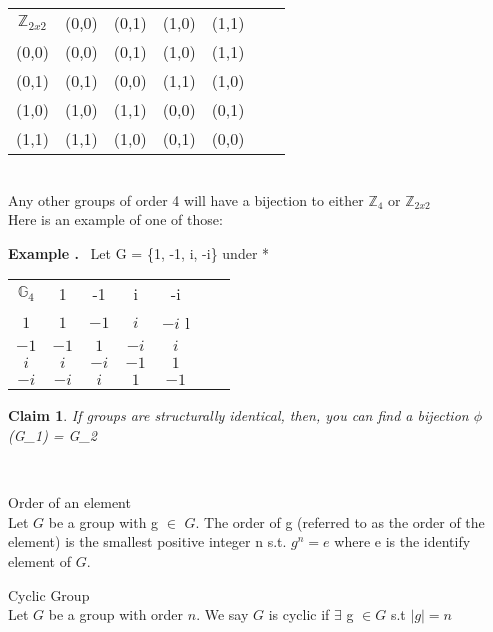 \documentclass{article}
\newcounter{example}
\newcounter{claim}
\newcounter{solution}
\theoremstyle{claim}
\newtheorem{claim}{Claim}[section]
\newcommand\Example{%
  \stepcounter{example}%
  \textbf{Example \theexample.}~%
  \setcounter{solution}{0}%
}
\begin{document}
\begin{center}
\setlength\extrarowheight{3pt}
\begin{tabular}{c | c c c c c c}
    $\mathbb{Z}_{2x2}$ &(0,0) & (0,1) & (1,0) & (1,1)  \\
    \cline{1-5}
    (0,0) & (0,0) & (0,1) & (1,0) & (1,1)  	\\
    (0,1) & (0,1) & (0,0) & (1,1) & (1,0) 	\\
    (1,0) & (1,0) & (1,1) & (0,0) & (0,1)		\\
    (1,1) & (1,1) & (1,0) & (0,1) & (0,0)		\\
\end{tabular}
\end{center}\\
Any other groups of order 4 will have a bijection to either $\mathbb{Z}_{4}$ or $\mathbb{Z}_{2x2}$\\
Here is an example of one of those:

\Example Let G = \{1, -1, i, -i\} under *\\
 
\begin{center}
\setlength\extrarowheight{3pt}
\begin{tabular}{c | c c c c c c}
    $\mathbb{G}_{4}$ & 1 & -1 & i & -i  \\
    \cline{1-5}
    $1$&$1$&$-1$&$ i$&$-i$  	l\\
    $-1$&$-1$&$1$&$-i$&$i$	\\
    $i$&$i$&$-i$&$-1$& $1$	\\
    $-i$&$-i$&$i$&$1$&$-1$	\\
\end{tabular}
\end{center}

\begin{claim}{}
If groups are structurally identical, then, you can find a bijection $\phi$(G_{1}) =  G_{2}
\end{claim}\\

\begin{definition}{Order of an element}\\
Let $G$ be a group with g $\in$ $G$. The order of g (referred to as the order of the element) is the smallest positive integer n s.t. $g^{n} = e$ where e is the identify element of $G$. 
\end{definition}

\begin{definition}{Cyclic Group}\\
Let $G$ be a group with order $n$. We say $G$ is cyclic if $\exists$ g $\in G$ s.t $|g|=n$
\end{definition}
\end{document}
